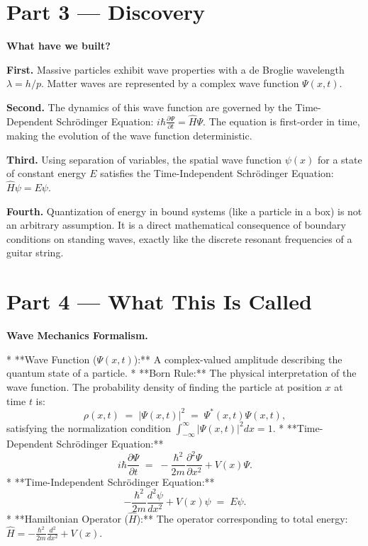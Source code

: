 \documentclass[12pt, a4paper, twoside]{book}
\begin{document}
\section{Part 3 --- Discovery}

\begin{discoverybox}
\textbf{What have we built?}

\textbf{First.} Massive particles exhibit wave properties with a de Broglie wavelength $\lambda = h/p$. Matter waves are represented by a complex wave function $\Psi(x, t)$.

\textbf{Second.} The dynamics of this wave function are governed by the Time-Dependent Schrödinger Equation: $i\hbar \frac{\partial \Psi}{\partial t} = \hat{H} \Psi$. The equation is first-order in time, making the evolution of the wave function deterministic.

\textbf{Third.} Using separation of variables, the spatial wave function $\psi(x)$ for a state of constant energy $E$ satisfies the Time-Independent Schrödinger Equation: $\hat{H}\psi = E\psi$.

\textbf{Fourth.} Quantization of energy in bound systems (like a particle in a box) is not an arbitrary assumption. It is a direct mathematical consequence of boundary conditions on standing waves, exactly like the discrete resonant frequencies of a guitar string.
\end{discoverybox}

\newpage

\section{Part 4 --- What This Is Called}

\begin{namebox}
\textbf{Wave Mechanics Formalism.}

* **Wave Function ($\Psi(x, t)$):** A complex-valued amplitude describing the quantum state of a particle.
* **Born Rule:** The physical interpretation of the wave function. The probability density of finding the particle at position $x$ at time $t$ is:
  \[
    \rho(x, t) \;=\; |\Psi(x, t)|^2 \;=\; \Psi^*(x, t)\Psi(x, t),
  \]
  satisfying the normalization condition $\int_{-\infty}^\infty |\Psi(x, t)|^2 dx = 1$.
* **Time-Dependent Schrödinger Equation:**
  \[
    i\hbar \frac{\partial \Psi}{\partial t} \;=\; -\frac{\hbar^2}{2m} \frac{\partial^2 \Psi}{\partial x^2} + V(x)\Psi.
  \]
* **Time-Independent Schrödinger Equation:**
  \[
    -\frac{\hbar^2}{2m} \frac{d^2 \psi}{dx^2} + V(x)\psi \;=\; E \psi.
  \]
* **Hamiltonian Operator ($\hat{H}$):** The operator corresponding to total energy: $\hat{H} = -\frac{\hbar^2}{2m}\frac{d^2}{dx^2} + V(x)$.
\end{namebox}
\end{document}

